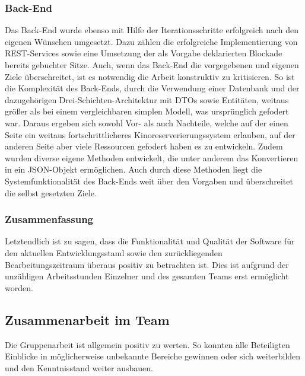 \subsubsection*{Back-End}
Das Back-End wurde ebenso mit Hilfe der Iterationsschritte erfolgreich nach den eigenen Wünschen umgesetzt.
Dazu zählen die erfolgreiche Implementierung von \acs{REST}-Services sowie eine Umsetzung der als Vorgabe deklarierten Blockade bereits gebuchter Sitze.
Auch, wenn das Back-End die vorgegebenen und eigenen Ziele überschreitet, ist es notwendig die Arbeit konstruktiv zu kritisieren.
So ist die Komplexität des Back-Ends, durch die Verwendung einer Datenbank und der dazugehörigen Drei-Schichten-Architektur mit \acsp{DTO} sowie Entitäten, weitaus größer als bei einem vergleichbaren simplen Modell, was ursprünglich gefodert war.
Daraus ergeben sich sowohl Vor- als auch Nachteile, welche auf der einen Seite ein weitaus fortschrittlicheres Kinoreserverierungssystem erlauben, auf der anderen Seite aber viele Ressourcen gefodert haben es zu entwickeln.
Zudem wurden diverse eigene Methoden entwickelt, die unter anderem das Konvertieren in ein \acs{JSON}-Objekt ermöglichen.
Auch durch diese Methoden liegt die Systemfunktionalität des Back-Ends weit über den Vorgaben und überschreitet die selbst gesetzten Ziele.

\subsubsection*{Zusammenfassung}
Letztendlich ist zu sagen, dass die Funktionalität und Qualität der Software für den aktuellen Entwicklungsstand sowie den zurückliegenden Bearbeitungszeitraum überaus positiv zu betrachten ist.
Dies ist aufgrund der unzähligen Arbeitsstunden Einzelner und des gesamten Teams erst ermöglicht worden.

\subsection{Zusammenarbeit im Team}

Die Gruppenarbeit ist allgemein positiv zu werten.
So konnten alle Beteiligten Einblicke in möglicherweise unbekannte Bereiche gewinnen oder sich weiterbilden und den Kenntnisstand weiter ausbauen.

